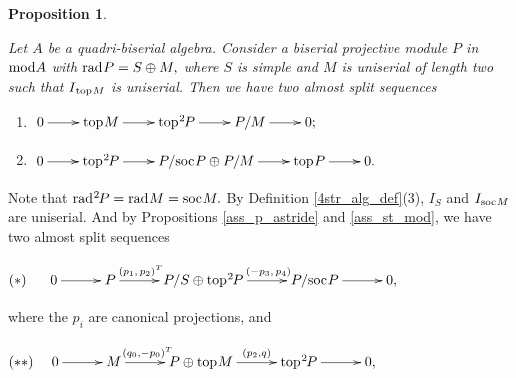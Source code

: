 \documentclass[10pt]{amsart}
\newtheorem{Prop}[Theo]{Proposition}
\theoremstyle{definition}
\newcommand{\mmod}{{\rm mod}}
\newcommand{\rad}{{\rm rad}\hspace{.5pt}}
\newcommand{\soc}{{\rm soc}\hspace{.5pt}}
\newcommand{\ntop}{{\rm top}\hspace{.5pt}}
\newcommand{\hp}{\hspace{.5pt}}
\begin{document}
\begin{Prop}\label{ass_p4_1} 

Let $A$ be a quadri-biserial algebra. Consider a biserial projective module $P$ in $\mmod A$ with $\rad P=S\oplus M,$ where $S$ is simple and $M$ is uniserial of length two such that $I_{\hp\ntop M}$ is uniserial. Then we have two almost split sequences

\begin{enumerate}[$(1)$]

\vspace{-3pt}

\item $\xymatrixcolsep{22pt}\xymatrix{0\ar[r] & \ntop M\ar[r] & \ntop^2\hspace{-1pt} P \ar[r]  & P/M \ar[r] & 0;}$ 

\vspace{-3pt}

\item $\xymatrixcolsep{22pt}\xymatrix{0\ar[r] & \ntop^2\hspace{-1pt} P \ar[r] & P/\soc P\oplus P/M \ar[r] & \ntop P \ar[r] & 0.}$

\end{enumerate}\end{Prop}

\vspace{-3pt}

 Note that $\rad^2\hspace{-1pt}P=\rad M=\soc M.$ By Definition \ref{4str_alg_def}(3), $I_S$ and $I_{\soc M}$ are uniserial. And by Propositions \ref{ass_p_astride} and \ref{ass_st_mod}, we have two almost split sequences \vspace{-1pt}

\noindent $(*) \hspace{14pt} \xymatrixcolsep{28pt}\xymatrix{ 0\ar[r]& P \ar[r]^-{(p_1, \,p_2)^T\hspace{-2pt}} & P/S \oplus \ntop^2\hspace{-1pt} P \ar[r]^-{(-p_3, \, p_4)\hspace{-2pt}} & P/\soc P \ar[r] & 0,}$


\noindent where the $p_i$ are canonical projections, and

\noindent $(**) \hspace{10pt}\xymatrixcolsep{28pt}\xymatrix{0 \ar[r]& M \ar[r]^-{(q_0, -p_0)^T\hspace{-3.5pt}} & P \oplus \ntop M \ar[r]^-{(p_2, q)} & \ntop^2\hspace{-1pt} P \ar[r] & 0,}$ 
\end{document}
